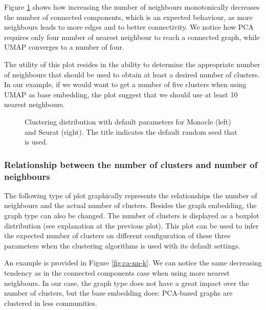 Figure \ref{fig:ca-conn-comp} shows how increasing the number of neighbours monotonically decreases the number of connected components, which is an expected behaviour, as more neighbours leads to more edges and to better connectivity. We notice how PCA requires only four number of nearest neighbour to reach a connected graph, while UMAP converges to a number of four. 

The utility of this plot resides in the ability to determine the appropriate number of neighbours that should be used to obtain at least a desired number of clusters. In our example, if we would want to get a number of five clusters when using UMAP as base embedding, the plot suggest that we should use at least 10 nearest neighbours.

\begin{figure}[H]
    \centering
    \caption{\label{fig:ca-conn-comp}Clustering distribution with default parameters for Monocle (left) and Seurat (right). The title indicates the default random seed that is used.}
\end{figure}

\subsubsection{Relationship between the number of clusters and number of neighbours}
The following type of plot graphically represents the relationships the number of neighbours and the actual number of clusters. Besides the graph embedding, the graph type can also be changed. The number of clusters is displayed as a boxplot distribution (see explanation at the previous plot). This plot can be used to infer the expected number of clusters on different configuration of these three parameters when the clustering algorithms is used with its default settings.

An example is provided in Figure \ref{fig:ca-nn-k}. We can notice the same decreasing tendency as in the connected components case when using more nearest neighbours. In our case, the graph type does not have a great impact over the number of clusters, but the base embedding does: PCA-based graphs are clustered in less communities.

